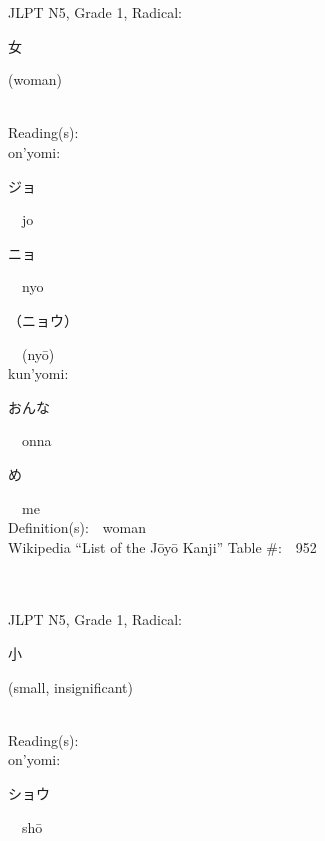 \begin{multicols}{2}
{JLPT N5, Grade 1, Radical:\ \ {\begin{CJK}{UTF8}{min} 女 \end{CJK}} (woman) } \\
Reading(s):\ \ \\
{\hspace*{1em}}on'yomi:\ \ \\
{\hspace*{2em}}{\begin{CJK}{UTF8}{min} ジョ \end{CJK}}\ \ jo\ \ \\
{\hspace*{2em}}{\begin{CJK}{UTF8}{min} ニョ \end{CJK}}\ \ nyo\ \ \\
{\hspace*{2em}}{\begin{CJK}{UTF8}{min} （ニョウ） \end{CJK}}\ \ (ny\=o)\ \ \\
{\hspace*{1em}}kun'yomi:\ \ \\
{\hspace*{2em}}{\begin{CJK}{UTF8}{min} おんな \end{CJK}}\ \ onna\ \ \\
{\hspace*{2em}}{\begin{CJK}{UTF8}{min} め \end{CJK}}\ \ me\ \ \\
Definition(s):\ \ woman \\
Wikipedia ``List of the J\=oy\=o Kanji'' Table \#:\ \ 952 \\
\ \ \\
{\fontsize{34pt}{40pt}  }\ \ \\  %
{JLPT N5, Grade 1, Radical:\ \ {\begin{CJK}{UTF8}{min} 小 \end{CJK}} (small, insignificant) } \\
Reading(s):\ \ \\
{\hspace*{1em}}on'yomi:\ \ \\
{\hspace*{2em}}{\begin{CJK}{UTF8}{min} ショウ \end{CJK}}\ \ sh\=o\ \ \\

\end{multicols}
